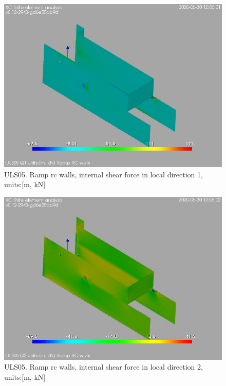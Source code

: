 \begin{figure}
\begin{center}
\includegraphics[width=\linewidth]{ramp_wall/resLC/text/graphics/resSimplLC/lULS05wallsQ1}
\caption{ULS05. Ramp rc walls, internal shear force in local direction 1, units:[m, kN]}
\end{center}
\end{figure}
\begin{figure}
\begin{center}
\includegraphics[width=\linewidth]{ramp_wall/resLC/text/graphics/resSimplLC/lULS05wallsQ2}
\caption{ULS05. Ramp rc walls, internal shear force in local direction 2, units:[m, kN]}
\end{center}
\end{figure}
